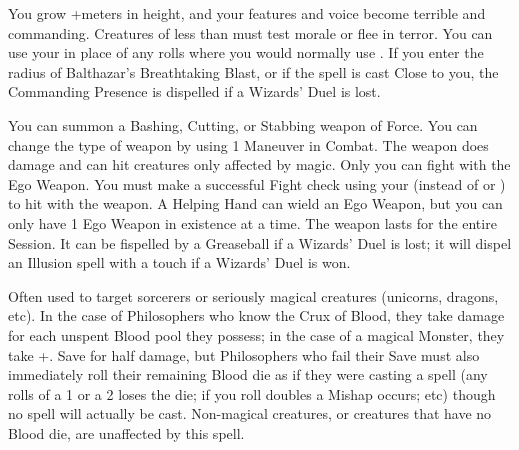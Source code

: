{\SPELL[
  Name=Commanding Presence,
  Link=wizardry-commanding-presence,
  Paradigm=Mind,
  Save=N,
  Duration=Combat or \SUMDICE Minutes,
  Counter=\mylink{Balthazar's Breathtaking Blast}{wizardry-balthazars-breathtaking-blast} ,
  Keywords=None,
  Target=Self
]

You grow +\DICE meters in height, and your features and voice become terrible and commanding.  Creatures of less than \DICE \HD must test morale or flee in terror.  You can use your \INT in place of any rolls where you
would normally use \VIG.  If you enter the radius of Balthazar's Breathtaking Blast, or if the spell is cast Close to you, the Commanding Presence is dispelled if a Wizards' Duel is lost.




\SPELL[
  Name=Ego Weapon,
  Link=wizardry-ego-weapon,
  Paradigm=Mind,
  Save=N,
  Duration=Session,
  Counter=\mylink{Greaseball}{wizardry-greaseball} ,
  Keywords=None,
  Target=Self
]



You can summon a Bashing, Cutting, or Stabbing weapon of Force.  You can change the type of weapon by using 1 Maneuver in Combat.  The weapon does \DICE damage and can hit creatures only affected by magic.  Only you can fight with the Ego Weapon.   You must make a successful
Fight check using your \INT (instead of \VIG or \DEX) to hit with the weapon.  A Helping Hand can wield an Ego Weapon, but you can only have 1 Ego Weapon in existence at a time.  The weapon lasts for the entire Session.  It can be fispelled by a Greaseball if a Wizards' Duel is lost; it will dispel an
Illusion spell with a touch if a Wizards' Duel is won.





\SPELL[
  Name=Enervate,
  Link=wizardry-enervate,
  Paradigm=Entropy,
  Save=Y (half),
  Duration=0,
  Counter=None ,
  Keywords=None,
  Target=Close or Nearby Magical Monster
]




Often used to target sorcerers or seriously magical creatures (unicorns, dragons, etc).  In the case of Philosophers who know the Crux of Blood, they take \DICE damage for each
unspent Blood pool they possess; in the case of a magical Monster, they take \SUMDICE+\DICE.  Save for half damage, but Philosophers who fail their Save
must also immediately roll their remaining Blood die as if they were casting a spell (any rolls of a 1 or a 2 loses the die; if you roll doubles a Mishap occurs; etc) though no spell will actually be cast.   Non-magical creatures,
or creatures that have no Blood die, are unaffected by this spell.



}
